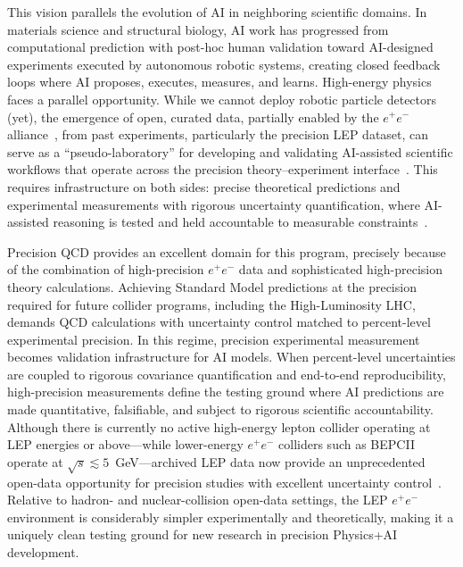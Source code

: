 This vision parallels the evolution of AI in neighboring scientific domains. In
materials science and structural biology, AI work has progressed from computational
prediction with post-hoc human validation toward AI-designed experiments executed
by autonomous robotic systems, creating closed feedback loops where AI proposes,
executes, measures, and learns. High-energy physics faces a parallel opportunity.
While we cannot deploy robotic particle detectors (yet), the emergence of open,
curated data, partially enabled by the $e^+e^-$ alliance~\cite{EEAlliance:website},
from past experiments, particularly the precision LEP dataset, can serve as a
``pseudo-laboratory'' for developing and validating AI-assisted scientific workflows
that operate across the precision theory--experiment
interface~\cite{Badea:2019vey,Chen:2021uws}. This requires infrastructure on both sides: precise theoretical predictions and experimental measurements with rigorous uncertainty quantification, where AI-assisted reasoning is tested and held accountable to measurable constraints~\cite{Wang:2023aai,Messeri:2024aiu,Woodruff:2026practicalsi}.

Precision QCD provides an excellent domain for this program, precisely because of the
combination of high-precision $e^{+}e^{-}$ data and sophisticated high-precision theory
calculations. Achieving Standard Model predictions at the precision required for future
collider programs, including the High-Luminosity LHC, demands QCD calculations with
uncertainty control matched to percent-level experimental precision. In this regime,
precision experimental measurement becomes validation infrastructure for AI models.
When percent-level uncertainties are coupled to rigorous covariance quantification and
end-to-end reproducibility, high-precision measurements define the testing ground where
AI predictions are made quantitative, falsifiable, and subject to rigorous scientific
accountability. Although there is currently no active high-energy lepton collider operating at LEP energies or above---while lower-energy $e^+e^-$ colliders such as BEPCII operate at $\sqrt{s} \lesssim 5$~GeV---archived LEP data now provide an unprecedented open-data opportunity for precision studies with excellent uncertainty control~\cite{EEAlliance:website,Badea:2019vey,Chen:2021uws}.
Relative to hadron- and nuclear-collision open-data settings, the LEP $e^{+}e^{-}$ environment is considerably simpler experimentally and theoretically, making it a uniquely clean testing ground for new research in precision Physics+AI development.

